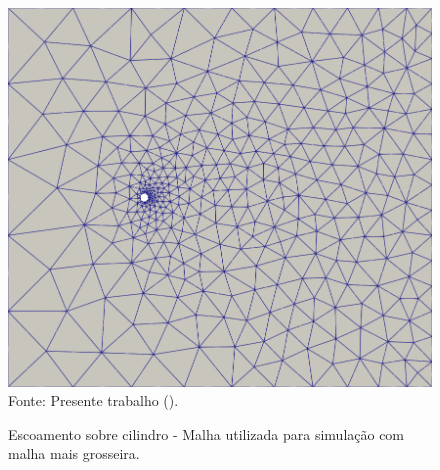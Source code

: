 \begin{figure}[h!]
    \centering
    \caption{Escoamento sobre cilindro - Malha utilizada para simulação com malha mais grosseira.}
    \includegraphics[width=.75\linewidth]{Figuras/cylinder/coarse/mesh.png}
    \\Fonte: Presente trabalho (\the\year).
    \label{fig:cyl-mesh2}
\end{figure}

